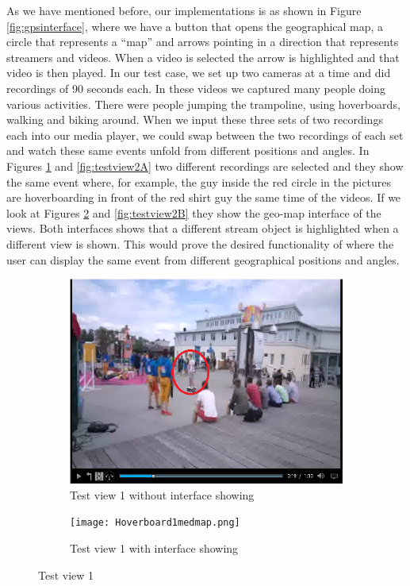 As we have mentioned before, our implementations is as shown in Figure \ref{fig:gpsinterface}, where we have a button that opens the geographical map, a circle that represents a “map” and arrows pointing in a direction that represents streamers and videos. When a video is selected the arrow is highlighted and that video is then played. In our test case, we set up two cameras at a time and did recordings of 90 seconds each. In these videos we captured many people doing various activities. There were people jumping the trampoline, using hoverboards, walking and biking around. When we input these three sets of two recordings each into our media player, we could swap between the two recordings of each set and watch these same events unfold from different positions and angles. In Figures \ref{fig:testview1A} and \ref{fig:testview2A} two different recordings are selected and they show the same event where, for example, the guy inside the red circle in the pictures are hoverboarding in front of the red shirt guy the same time of the videos. If we look at Figures \ref{fig:testview1B} and \ref{fig:testview2B} they show the geo-map interface of the views. Both interfaces shows that a different stream object is highlighted when a different view is shown. This would prove the desired functionality of where the user can display the same event from different geographical positions and angles.

\begin{figure}
\begin{subfigure}[b]{0.5\textwidth}
 	\includegraphics[width=\linewidth]{Hoverboard_1.png}
  	\caption{Test view 1 without interface showing}\label{fig:testview1A}
    \end{subfigure}\hfill 
    \hspace{3px}
    \begin{subfigure}[b]{0.5\textwidth}
	\texttt{[image: Hoverboard1medmap.png]}
  	\caption{Test view 1 with interface showing}\label{fig:testview1B}
    \end{subfigure}
	\caption{Test view 1}
	\label{fig:testview1}
\end{figure}

